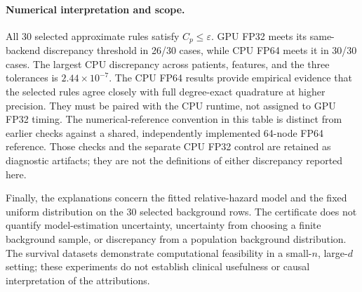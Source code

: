 \paragraph{Numerical interpretation and scope.}
All 30 selected approximate rules satisfy $C_p\le\varepsilon$.
GPU FP32 meets its same-backend discrepancy threshold in 26/30
cases, while CPU FP64 meets it in 30/30 cases.
The largest CPU discrepancy across patients, features, and the three
tolerances is $2.44\times10^{-7}$.
The CPU FP64 results provide empirical evidence that the selected rules
agree closely with full degree-exact quadrature at higher precision.
They must be paired with the CPU runtime, not assigned to GPU FP32 timing.
The numerical-reference convention in this table is distinct from earlier
checks against a shared, independently implemented 64-node FP64 reference.
Those checks and the separate CPU FP32 control are retained as diagnostic
artifacts; they are not the definitions of either discrepancy reported here.

Finally, the explanations concern the fitted relative-hazard model and the
fixed uniform distribution on the 30 selected background rows. The
certificate does not quantify model-estimation uncertainty, uncertainty
from choosing a finite background sample, or discrepancy from a population
background distribution. The survival datasets demonstrate computational
feasibility in a small-$n$, large-$d$ setting; these experiments do not
establish clinical usefulness or causal interpretation of the attributions.

